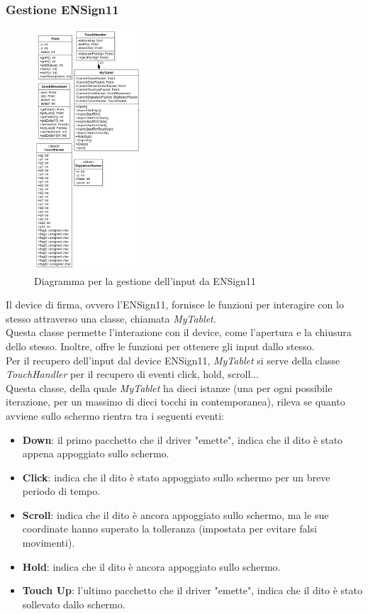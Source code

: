 \subsubsection{Gestione ENSign11}
\begin{figure}[h]
    \centering
    \includegraphics[width=115pt]{images/prog/ENS11.png}
    \caption{Diagramma per la gestione dell'input da ENSign11}
    \label{fig:es11}
\end{figure}
Il device di firma, ovvero l'ENSign11, fornisce le funzioni per interagire con lo stesso attraverso una classe, chiamata \emph{MyTablet}.\\
Questa classe permette l'interazione con il device, come l'apertura e la chiusura dello stesso. Inoltre, offre le funzioni per ottenere gli input dallo stesso.\\
Per il recupero dell'input dal device ENSign11, \emph{MyTablet} si serve della classe \emph{TouchHandler} per il recupero di eventi click, hold, scroll...\\
Questa classe, della quale \emph{MyTablet} ha dieci istanze (una per ogni possibile iterazione, per un massimo di dieci tocchi in contemporanea), rileva se quanto avviene sullo schermo rientra tra i seguenti eventi:
\begin{itemize}
    \item \textbf{Down}: il primo pacchetto che il driver "emette", indica che il dito è stato appena appoggiato sullo schermo.
    \item \textbf{Click}: indica che il dito è stato appoggiato sullo schermo per un breve periodo di tempo.
    \item \textbf{Scroll}: indica che il dito è ancora appoggiato sullo schermo, ma le sue coordinate hanno superato la tolleranza (impostata per evitare falsi movimenti).
    \item \textbf{Hold}: indica che il dito è ancora appoggiato sullo schermo.
    \item \textbf{Touch Up}: l'ultimo pacchetto che il driver "emette", indica che il dito è stato sollevato dallo schermo.
\end{itemize}
